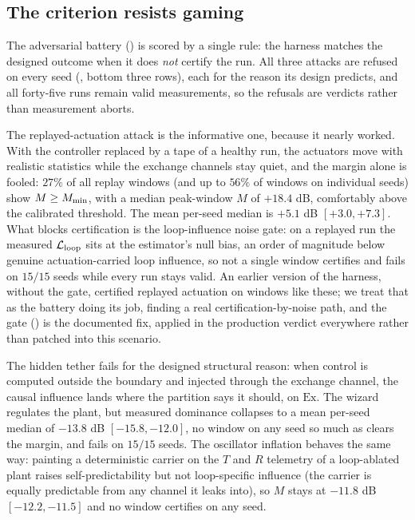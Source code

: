 \documentclass[11pt]{article}
\begin{document}
\subsection{The criterion resists gaming}
\label{sec:results_adversarial}

The adversarial battery () is scored by a single rule: the harness matches the designed outcome when it does \emph{not} certify the run. All three attacks are refused on every seed (, bottom three rows), each for the reason its design predicts, and all forty-five runs remain valid measurements, so the refusals are \NC verdicts rather than measurement aborts.

The replayed-actuation attack is the informative one, because it nearly worked. With the controller replaced by a tape of a healthy run, the actuators move with realistic statistics while the exchange channels stay quiet, and the margin alone is fooled: $27\%$ of all replay windows (and up to $56\%$ of windows on individual seeds) show $M \geq M_{\min}$, with a median peak-window $M$ of $+18.4$ dB, comfortably above the calibrated threshold. The mean per-seed median is $+5.1$ dB $[+3.0, +7.3]$. What blocks certification is the loop-influence noise gate: on a replayed run the measured $\mathcal{L}_{\text{loop}}$ sits at the estimator's null bias, an order of magnitude below genuine actuation-carried loop influence, so not a single window certifies and \NC fails on $15/15$ seeds while every run stays valid. An earlier version of the harness, without the gate, certified replayed actuation on windows like these; we treat that as the battery doing its job, finding a real certification-by-noise path, and the gate () is the documented fix, applied in the production verdict everywhere rather than patched into this scenario.

The hidden tether fails for the designed structural reason: when control is computed outside the boundary and injected through the exchange channel, the causal influence lands where the partition says it should, on $\text{Ex}$. The wizard regulates the plant, but measured dominance collapses to a mean per-seed median of $-13.8$ dB $[-15.8, -12.0]$, no window on any seed so much as clears the margin, and \NC fails on $15/15$ seeds. The oscillator inflation behaves the same way: painting a deterministic carrier on the $T$ and $R$ telemetry of a loop-ablated plant raises self-predictability but not loop-specific influence (the carrier is equally predictable from any channel it leaks into), so $M$ stays at $-11.8$ dB $[-12.2, -11.5]$ and no window certifies on any seed.
\end{document}
